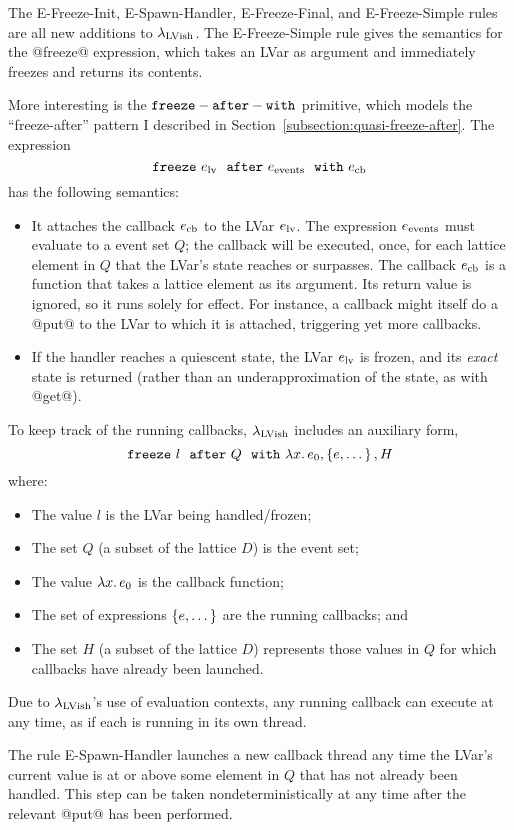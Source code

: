 The {\sc E-Freeze-Init}, {\sc E-Spawn-Handler}, {\sc E-Freeze-Final},
and {\sc E-Freeze-Simple} rules are all new additions to
$\lambda_{\textrm{LVish}}$.  The {\sc E-Freeze-Simple} rule gives the semantics
for the @freeze@ expression, which takes an LVar as argument and
immediately freezes and returns its contents.

More interesting is the ${\mbox{\texttt{freeze}}-\mbox{\texttt{after}}-\mbox{\texttt{with}}}$ primitive, which models the
``freeze-after'' pattern I described in
Section~\ref{subsection:quasi-freeze-after}.  The expression
\[ \mbox{\texttt{freeze}}~e_{\rm lv}~~{\mbox{\texttt{after}}}~e_{\rm events}~~{\mbox{\texttt{with}}}~e_{\rm cb} \]
has the following semantics:
\begin{itemize}
\item It attaches the callback $e_{\rm cb}$ to the LVar $e_{\rm lv}$.
  The expression $e_{\rm events}$ must evaluate to a event set $Q$;
  the callback will be executed, once, for each lattice element in $Q$
  that the LVar's state reaches or surpasses.  The callback $e_{\rm
    cb}$ is a function that takes a lattice element as its argument.
  Its return value is ignored, so it runs solely for effect.  For
  instance, a callback might itself do a @put@ to the LVar to which it
  is attached, triggering yet more callbacks.
\item If the handler reaches a quiescent state, the LVar $e_{\rm lv}$
  is frozen, and its \emph{exact} state is returned (rather than an
  underapproximation of the state, as with @get@).
\end{itemize}
To keep track of the running callbacks, $\lambda_{\textrm{LVish}}$ includes an
auxiliary form,
\[
\mbox{\texttt{freeze}}~l~~{\mbox{\texttt{after}}}~Q~~{\mbox{\texttt{with}}}~\lambda x.\,e_0, \left\{e, \dots\right\}, H
\]
where:
\begin{itemize}
\item The value $l$ is the LVar being handled/frozen;
\item The set $Q$ (a subset of the lattice $D$) is the event set;
\item The value $\lambda x.\,e_0$ is the callback function;
\item The set of expressions $\left\{e, \dots\right\}$ are the running
  callbacks; and
\item The set $H$ (a subset of the lattice $D$) represents those
  values in $Q$ for which callbacks have already been launched.
\end{itemize}
Due to $\lambda_{\textrm{LVish}}$'s use of evaluation contexts, any running
callback can execute at any time, as if each is running in its own
thread.

The rule {\sc E-Spawn-Handler} launches a new callback thread any time
the LVar's current value is at or above some element in $Q$ that has
not already been handled.  This step can be taken nondeterministically
at any time after the relevant @put@ has been performed.

